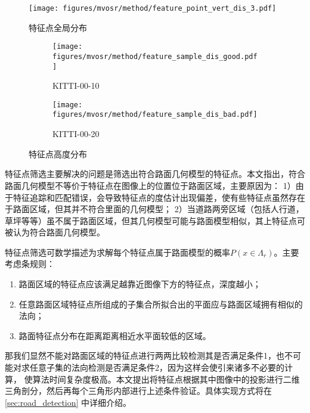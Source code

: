 \begin{figure}
    \centering
    \texttt{[image: figures/mvosr/method/feature\_point\_vert\_dis\_3.pdf]}
    \caption{特征点全局分布}
    \label{fig:mvosr_method_vert_dis}
\end{figure}

\begin{figure}
    \centering
    \begin{subfigure}[c]{0.45\textwidth}
        \texttt{[image: figures/mvosr/method/feature\_sample\_dis\_good.pdf]}
        \caption{KITTI-00-10}
        \label{fig:mvosr_method_dis_good}
    \end{subfigure}
    \begin{subfigure}[c]{0.45\textwidth}
        \texttt{[image: figures/mvosr/method/feature\_sample\_dis\_bad.pdf]}
        \caption{KITTI-00-20}
        \label{fig:mvosr_method_dis_bad}
    \end{subfigure}
    \caption{特征点高度分布}
    \label{fig:mvosr_method_dis}
\end{figure}

特征点筛选主要解决的问题是筛选出符合路面几何模型的特征点。本文指出，符合路面几何模型不等价于特征点在图像上的位置位于路面区域，主要原因为：
1）由于特征追踪和匹配错误，会导致特征点的度估计出现偏差，使有些特征点虽然存在于路面区域，但其并不符合里面的几何模型；
2）当道路两旁区域（包括人行道，草坪等等）虽不属于路面区域，但其几何模型可能与路面模型相似，其上特征点可被认为符合路面几何模型。

特征点筛选可数学描述为求解每个特征点属于路面模型的概率$P(x \in \Lambda_r)$。主要考虑条规则：
\begin{enumerate}
    \item 路面区域的特征点应该满足越靠近图像下方的特征点，深度越小；
    \item 任意路面区域特征点所组成的子集合所拟合出的平面应与路面区域拥有相似的法向；
    \item 路面特征点分布在距离距离相近水平面较低的区域。
\end{enumerate}

那我们显然不能对路面区域的特征点进行两两比较检测其是否满足条件1，也不可能对求任意子集的法向检测是否满足条件2，因为这样会使引来诸多不必要的计算，
使算法时间复杂度极高。本文提出将特征点根据其中图像中的投影进行二维三角剖分，然后再每个三角形内部进行上述条件验证。具体实现方式将在\ref{sec:road_detection}
中详细介绍。


